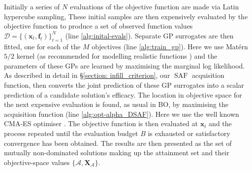 \documentclass[conference]{IEEEtran}
\newcommand{\evaluatedx}{\bX}
\newcommand{\attainmentfront}{\mathcal{A}}
\newcommand{\attainmentset}{\evaluatedx_{\mathcal{A}}}
\newcommand{\ninitialevaluations}{N}
\newcommand{\nbudget}{B}
\newcommand{\nobj}{M}
\DeclareMathOperator*{\saf}{SAF}
\newcommand\gp{GP\xspace}
\newcommand\gps{GPs\xspace}
\newcommand{\bx}{\mathbf{x}}
\newcommand{\bX}{\mathbf{X}}
\newcommand{\bff}{\mathbf{f}}
\newcommand{\data}{\mathcal{D}}
\begin{document}
Initially a series of $\ninitialevaluations$ evaluations of the objective function are made via  Latin hypercube sampling, These initial samples are then expensively evaluated by the objective function to produce a set of observed function values  $\data = \{(\bx_t, \bff_t)\}_{t=1}^{\ninitialevaluations}$ (line \ref{alg:inital-evals}). Separate \gp surrogates are then fitted, one for each of the $\nobj$ objectives (line \ref{alg:train_gp}). Here we use Mat{\'e}rn $5/2$ kernel (as recommended for modelling realistic functions \cite{snoek2012practical}) and the parameters of these \gps are
learned by maximising the marginal log likelihood. As described in detail in \S\ref{section: infill_criterion}, our $\saf$ acquisition function, then converts the joint prediction
of these GP surrogates into a scalar prediction of a candidate solution's
efficacy. The location in objective space for the next expensive
evaluation is found, as usual in BO, by maximising the acquisition function
(line \ref{alg:opt-alpha_DSAF}).  Here we use the well known CMA-ES optimiser
 \cite{hansen2003reducing}. The objective function is then evaluated at
 $\mathbf{x}_t$ and the process repeated until the evaluation budget $\nbudget$ is
 exhausted or satisfactory convergence has been obtained. The results are then presented as the set of mutually non-dominated solutions making up the attainment set and their objective-space values $\{\attainmentfront, \attainmentset\}$.
\end{document}
